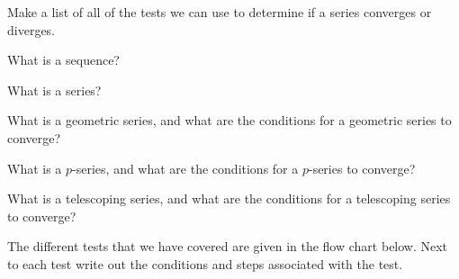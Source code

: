 \begin{problem}
    \item Make a list of all of the tests we can use to determine if a series converges or diverges.
\end{problem}

\begin{problem}
\item What is a sequence?
  \vfill
\item What is a series?
  \vfill

\item  What is a geometric series, and what are the conditions for a geometric series to converge?
  \vfill

\item  What is a $p$-series, and what are the conditions for a $p$-series to converge?
  \vfill

  \item  What is a telescoping series, and what are the conditions for a telescoping series to converge?
    \vfill

  \clearpage

  \item The different tests that we have covered are given in the flow chart below.
        Next to each test write out the conditions and steps associated with the test.


\end{problem}
